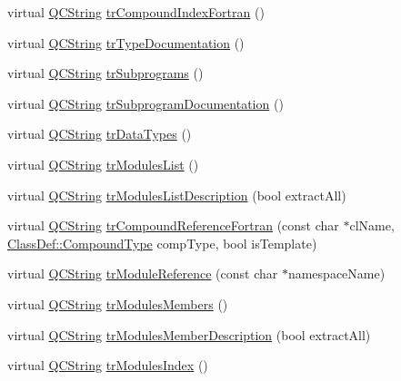 \begin{DoxyCompactItemize}
\item 
virtual \hyperlink{class_q_c_string}{Q\-C\-String} \hyperlink{class_translator_dutch_a933624b6cffb8fdc03e9fc4110640fc9}{tr\-Compound\-Index\-Fortran} ()
\item 
virtual \hyperlink{class_q_c_string}{Q\-C\-String} \hyperlink{class_translator_dutch_ae031421205271f1a32fa3838a79b8902}{tr\-Type\-Documentation} ()
\item 
virtual \hyperlink{class_q_c_string}{Q\-C\-String} \hyperlink{class_translator_dutch_a8d4e1de8fb5c2af1fd073c682556f999}{tr\-Subprograms} ()
\item 
virtual \hyperlink{class_q_c_string}{Q\-C\-String} \hyperlink{class_translator_dutch_add6df0842eb6016d108814567d677055}{tr\-Subprogram\-Documentation} ()
\item 
virtual \hyperlink{class_q_c_string}{Q\-C\-String} \hyperlink{class_translator_dutch_a77941890cf3f7cd1b67bec4cea91439b}{tr\-Data\-Types} ()
\item 
virtual \hyperlink{class_q_c_string}{Q\-C\-String} \hyperlink{class_translator_dutch_a411e2c242c2707aed706b2b0572292db}{tr\-Modules\-List} ()
\item 
virtual \hyperlink{class_q_c_string}{Q\-C\-String} \hyperlink{class_translator_dutch_a4f1ad06ac7478b9058d7f388a2b67566}{tr\-Modules\-List\-Description} (bool extract\-All)
\item 
virtual \hyperlink{class_q_c_string}{Q\-C\-String} \hyperlink{class_translator_dutch_a79d39414275f1cacb484f78806a65869}{tr\-Compound\-Reference\-Fortran} (const char $\ast$cl\-Name, \hyperlink{class_class_def_a768a6f0a6fd7e9087ff7971abbcc3f36}{Class\-Def\-::\-Compound\-Type} comp\-Type, bool is\-Template)
\item 
virtual \hyperlink{class_q_c_string}{Q\-C\-String} \hyperlink{class_translator_dutch_a5b0385db8ce8e7c8251e31867c6fa8d5}{tr\-Module\-Reference} (const char $\ast$namespace\-Name)
\item 
virtual \hyperlink{class_q_c_string}{Q\-C\-String} \hyperlink{class_translator_dutch_a75279d9914e0cc54ee5f4b15ddaa234c}{tr\-Modules\-Members} ()
\item 
virtual \hyperlink{class_q_c_string}{Q\-C\-String} \hyperlink{class_translator_dutch_a26dd0f47c7f59841f901da7f4bd19306}{tr\-Modules\-Member\-Description} (bool extract\-All)
\item 
virtual \hyperlink{class_q_c_string}{Q\-C\-String} \hyperlink{class_translator_dutch_a8a71cbe9e0669d3555731c3ebc0aae35}{tr\-Modules\-Index} ()
\item 

\end{DoxyCompactItemize}

